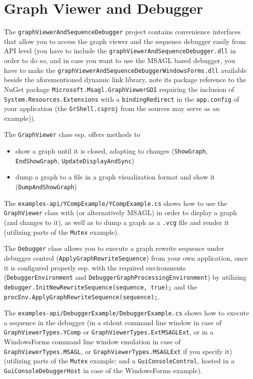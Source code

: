 \section{Graph Viewer and Debugger}
The \texttt{graph\-Viewer\-And\-Sequence\-Debugger} project contains convenience interfaces that allow you to access the graph viewer and the sequence debugger easily from API level (you have to include the \texttt{graph\-Viewer\-And\-Sequence\-Debugger.dll} in order to do so, and in case you want to use the MSAGL based debugger, you have to make the \texttt{graph\-Viewer\-And\-Sequence\-Debugger\-Windows\-Forms.dll} available beside the aforementioned dynamic link library, note its package reference to the NuGet package \texttt{Microsoft.Msagl.Graph\-Viewer\-GDI} requiring the inclusion of \texttt{System.Resources.Extensions} with a \texttt{binding\-Redirect} in the \texttt{app.config} of your application (the \texttt{GrShell.csproj} from the sources may serve as an example)).

The \texttt{GraphViewer} class esp. offers methods to
\begin{itemize}
	\item show a graph until it is closed, adapting to changes (\texttt{Show\-Graph}, \texttt{End\-Show\-Graph}, \texttt{Update\-Display\-And\-Sync})
	\item dump a graph to a file in a graph visualization format and show it (\texttt{Dump\-And\-Show\-Graph})
\end{itemize}

The \texttt{examples-api/YCompExample/YCompExample.cs} shows how to use the \texttt{GraphViewer} class with \yComp{} (or alternatively MSAGL) in order to display a graph (and changes to it), as well as to dump a graph as a \texttt{.vcg} file and render it (utilizing parts of the \texttt{Mutex} example).

The \texttt{Debugger} class allows you to execute a graph rewrite sequence under debugger control (\texttt{Apply\-Graph\-Rewrite\-Sequence}) from your own application, once it is configured properly esp. with the required environments (\texttt{Debugger\-Environment} and \texttt{Debugger\-Graph\-Processing\-Environment}) by utilizing 
\texttt{debugger.Init\-New\-Rewrite\-Sequence(sequence, true);} and the \texttt{procEnv.Apply\-Graph\-Rewrite\-Sequence(sequence);}.

The \texttt{examples-api/DebuggerExample/DebuggerExample.cs} shows how to execute a sequence in the debugger (in a stdout command line window in case of \texttt{GraphViewerTypes.YComp} or \texttt{GraphViewerTypes.ExtMSAGLExt}, or in a WindowsForms command line window emulation in case of \texttt{GraphViewerTypes.MSAGL}, or \texttt{GraphViewerTypes.MSAGLExt} if you specify it) (utilizing parts of the \texttt{Mutex} example; and a \texttt{Gui\-Console\-Control}, hosted in a \texttt{Gui\-Console\-Debugger\-Host} in case of the WindowsForms example).


